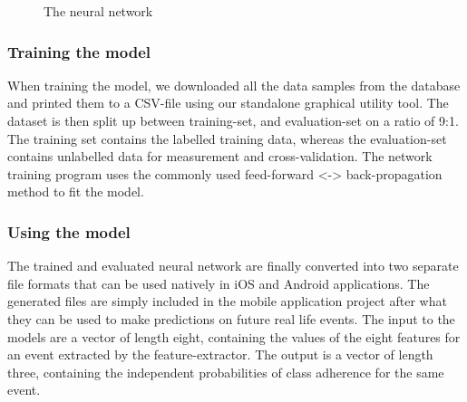 \documentclass[12pt, a4paper, onecolumn]{article}
\begin{document}
	\begin{figure}[H]
		\centering
		\caption{The neural network}%
		\label{fig:neural-network}%
	\end{figure}
	
	\subsubsection{Training the model}
	When training the model, we downloaded all the data samples from the database and printed them to a CSV-file using our standalone graphical utility tool. The dataset is then split up between training-set, and evaluation-set on a ratio of 9:1. The training set contains the labelled training data, whereas the evaluation-set contains unlabelled data for measurement and cross-validation. The network training program uses the commonly used feed-forward <-> back-propagation method \cite{neural_networks} to fit the model. 
	
	
	\subsubsection{Using the model}
	The trained and evaluated neural network are finally converted into two separate file formats that can be used natively in iOS and Android applications. The generated files are simply included in the mobile application project after what they can be used to make predictions on future real life events. The input to the models are a vector of length eight, containing the values of the eight features for an event extracted by the feature-extractor. The output is a vector of length three, containing the independent probabilities of class adherence for the same event. 
	
\end{document}
